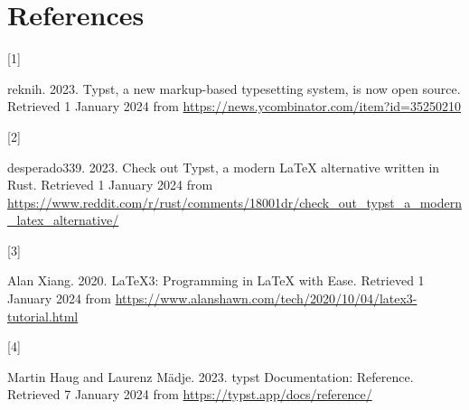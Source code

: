 \documentclass[
  a4paper,
]{article}
\newlength{\cslhangindent}
\newlength{\csllabelwidth}
\newlength{\cslentryspacingunit} %
\newenvironment{CSLReferences}[2] %
 {%
  \setlength{\parindent}{0pt}
  \ifodd #1
  \let\oldpar\par
  \def\par{\hangindent=\cslhangindent\oldpar}
  \fi
  \setlength{\parskip}{#2\cslentryspacingunit}
 }%
 {}
\newcommand{\CSLLeftMargin}[1]{\parbox[t]{\csllabelwidth}{#1}}
\newcommand{\CSLRightInline}[1]{\parbox[t]{\linewidth - \csllabelwidth}{#1}\break}
\begin{document}
\hypertarget{bibliography}{%
\section*{References}\label{bibliography}}

\hypertarget{refs}{}
\begin{CSLReferences}{0}{0}
\leavevmode{}%
\CSLLeftMargin{{[}1{]} }%
\CSLRightInline{reknih. 2023. {Typst, a new markup-based typesetting
system, is now open source}. Retrieved 1 January 2024 from
\url{https://news.ycombinator.com/item?id=35250210}}

\leavevmode{}%
\CSLLeftMargin{{[}2{]} }%
\CSLRightInline{desperado339. 2023. {Check out Typst, a modern LaTeX
alternative written in Rust}. Retrieved 1 January 2024
from\href{\%0A\%20\%20\%20\%20\%20\%20\%20\%20\%20\%20\%20https://www.reddit.com/r/rust/comments/18001dr/check_out_typst_a_modern_latex_alternative/\%0A\%20\%20\%20\%20\%20\%20\%20\%20\%20\%20\%20}{
https://www.reddit.com/r/rust/comments/18001dr/check\_out\_typst\_a\_modern\_latex\_alternative/
}}

\leavevmode{}%
\CSLLeftMargin{{[}3{]} }%
\CSLRightInline{Alan Xiang. 2020. {LaTeX3: Programming in LaTeX with
Ease}. Retrieved 1 January 2024 from
\url{https://www.alanshawn.com/tech/2020/10/04/latex3-tutorial.html}}

\leavevmode{}%
\CSLLeftMargin{{[}4{]} }%
\CSLRightInline{Martin Haug and Laurenz Mädje. 2023. {typst
Documentation: Reference}. Retrieved 7 January 2024 from
\url{https://typst.app/docs/reference/}}

\end{CSLReferences}
\end{document}

